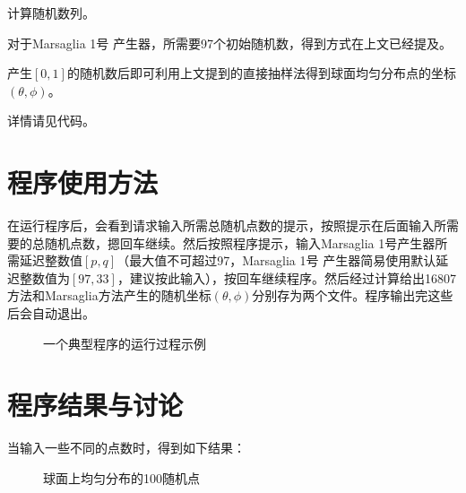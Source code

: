\documentclass[a4paper,11pt]{article}
\begin{document}
计算随机数列。

对于Marsaglia 1号 产生器，所需要97个初始随机数，得到方式在上文已经提及。

产生$[0,1]$的随机数后即可利用上文提到的直接抽样法得到球面均匀分布点的坐标$(\theta,\phi)$。

详情请见代码。

\section{程序使用方法}
在运行程序后，会看到请求输入所需总随机点数的提示，按照提示在后面输入所需要的总随机点数，摁回车继续。然后按照程序提示，输入Marsaglia 1号产生器所需延迟整数值$[p,q]$（最大值不可超过97，Marsaglia 1号 产生器简易使用默认延迟整数值为$[97,33]$，建议按此输入），按回车继续程序。然后经过计算给出16807方法和Marsaglia方法产生的随机坐标$(\theta,\phi)$分别存为两个文件。程序输出完这些后会自动退出。
\begin{figure}[!htbp]        
\caption{\label{1} 一个典型程序的运行过程示例}      
\end{figure}

\newpage
\section{程序结果与讨论}
当输入一些不同的点数时，得到如下结果：
\begin{figure}[!htbp]        
\caption{球面上均匀分布的100随机点}      
\end{figure}
\end{document}
